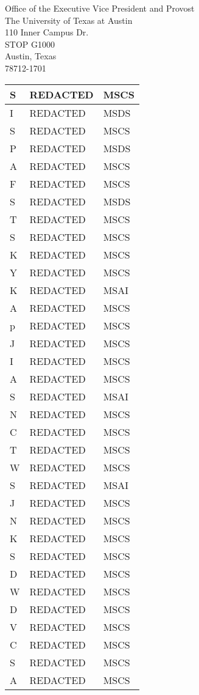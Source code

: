 \documentclass[11pt]{letter}
\begin{document}
\begin{letter}{Office of the Executive Vice President and Provost \\ The University of Texas at Austin \\ 110 Inner Campus Dr. \\ STOP G1000 \\ Austin, Texas \\ 78712-1701}
\begin{tabular}{|p{5cm}|p{6.7cm}|p{2.25cm}|}
        S & REDACTED & MSCS \\ \hline
        I & REDACTED & MSDS \\ \hline
        S & REDACTED & MSCS \\ \hline
        P & REDACTED & MSDS \\ \hline
        A & REDACTED & MSCS \\ \hline
        F & REDACTED & MSCS \\ \hline
        S & REDACTED & MSDS \\ \hline
        T & REDACTED & MSCS \\ \hline
        S & REDACTED & MSCS \\ \hline
        K & REDACTED & MSCS \\ \hline
        Y & REDACTED & MSCS \\ \hline
        K & REDACTED & MSAI \\ \hline
        A & REDACTED & MSCS \\ \hline
        p & REDACTED & MSCS \\ \hline
        J & REDACTED & MSCS \\ \hline
        I & REDACTED & MSCS \\ \hline
        A & REDACTED & MSCS \\ \hline
        S & REDACTED & MSAI \\ \hline
        N & REDACTED & MSCS \\ \hline
        C & REDACTED & MSCS \\ \hline
        T & REDACTED & MSCS \\ \hline
        W & REDACTED & MSCS \\ \hline
        S & REDACTED & MSAI \\ \hline
        J & REDACTED & MSCS \\ \hline
        N & REDACTED & MSCS \\ \hline
        K & REDACTED & MSCS \\ \hline
        S & REDACTED & MSCS \\ \hline
        D & REDACTED & MSCS \\ \hline
        W & REDACTED & MSCS \\ \hline
        D & REDACTED & MSCS \\ \hline
        V & REDACTED & MSCS \\ \hline
        C & REDACTED & MSCS \\ \hline
        S & REDACTED & MSCS \\ \hline
        A & REDACTED & MSCS \\ \hline

\end{tabular}
\end{letter}
\end{document}

